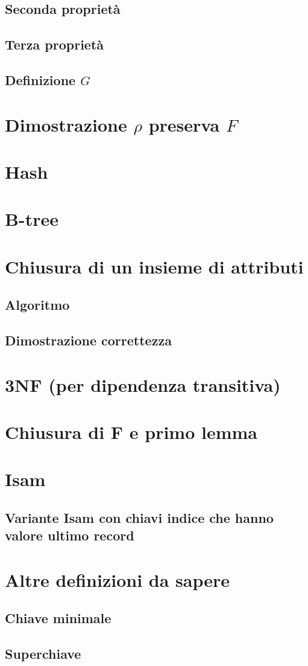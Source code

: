 \documentclass{article}
\begin{document}
\subsection{Seconda proprietà}
\subsection{Terza proprietà}
\subsection{Definizione $G$}
\pagebreak
\section{Dimostrazione $\rho$ preserva $F$}
\pagebreak
\section{Hash}
\pagebreak
\section{B-tree}
\pagebreak
\section{Chiusura di un insieme di attributi}
\subsection{Algoritmo}
\subsection{Dimostrazione correttezza}
\pagebreak
\section{3NF (per dipendenza transitiva)}
\pagebreak
\section{Chiusura di F e primo lemma}
\pagebreak
\section{Isam}
\subsection{Variante Isam con chiavi indice che hanno valore ultimo record}
\pagebreak
\section{Altre definizioni da sapere}
\subsection{Chiave minimale} 
\subsection{Superchiave}
\end{document}
